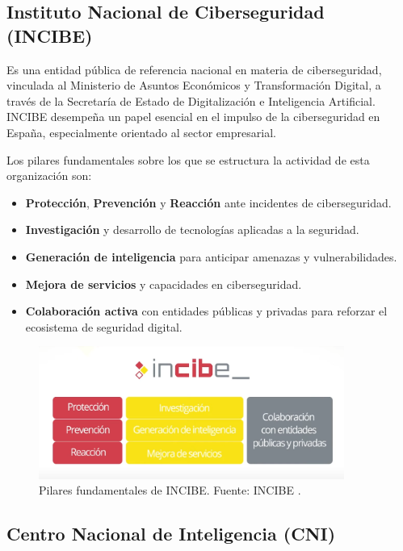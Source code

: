 \documentclass[a4paper, 11pt]{article}
\begin{document}
\subsection*{Instituto Nacional de Ciberseguridad (INCIBE)}
 Es una entidad pública de referencia nacional en materia de ciberseguridad, vinculada al Ministerio de Asuntos Económicos 
y Transformación Digital, a través de la Secretaría de Estado de Digitalización e Inteligencia Artificial. INCIBE desempeña un papel esencial en el impulso de la 
ciberseguridad en España, especialmente orientado al sector empresarial. \cite{incibe}

\par\vspace{0.5cm}

Los pilares fundamentales sobre los que se estructura la actividad de esta organización son:
\begin{itemize}
\item \textbf{Protección}, \textbf{Prevención} y \textbf{Reacción} ante incidentes de ciberseguridad.
\item \textbf{Investigación} y desarrollo de tecnologías aplicadas a la seguridad.
\item \textbf{Generación de inteligencia} para anticipar amenazas y vulnerabilidades.
\item \textbf{Mejora de servicios} y capacidades en ciberseguridad.
\item \textbf{Colaboración activa} con entidades públicas y privadas para reforzar el ecosistema de seguridad digital.
\end{itemize}

\begin{figure}[H]
\centering
\includegraphics[width=10cm]{images/incibe.png}
\caption{Pilares fundamentales de INCIBE. Fuente: INCIBE \cite{incibe}.}
\label{fig:incibe-pilares}
\end{figure}

\par\vspace{0.5cm}
\subsection*{Centro Nacional de Inteligencia (CNI)}
\end{document}
